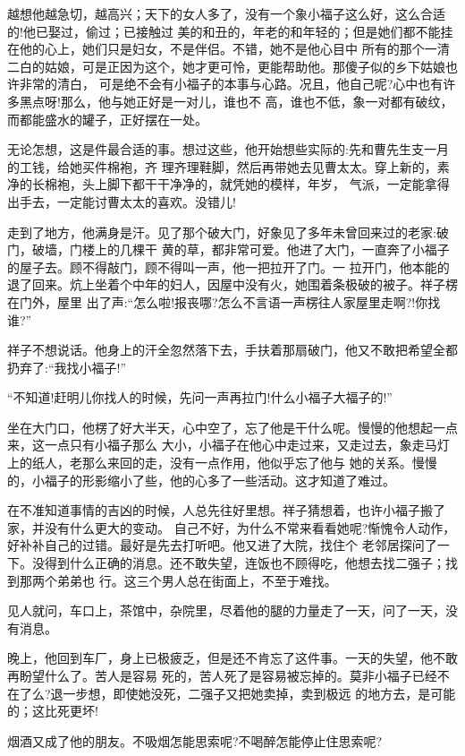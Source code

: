 \documentclass[11pt,a4paper,onecolumn]{article}
\begin{document}
越想他越急切，越高兴；天下的女人多了，没有一个象小福子这么好，这么合适的!他已娶过，偷过；已接触过
美的和丑的，年老的和年轻的；但是她们都不能挂在他的心上，她们只是妇女，不是伴侣。不错，她不是他心目中
所有的那个一清二白的姑娘，可是正因为这个，她才更可怜，更能帮助他。那傻子似的乡下姑娘也许非常的清白，
可是绝不会有小福子的本事与心路。况且，他自己呢?心中也有许多黑点呀!那么，他与她正好是一对儿，谁也不
高，谁也不低，象一对都有破纹，而都能盛水的罐子，正好摆在一处。

无论怎想，这是件最合适的事。想过这些，他开始想些实际的:先和曹先生支一月的工钱，给她买件棉袍，齐
理齐理鞋脚，然后再带她去见曹太太。穿上新的，素净的长棉袍，头上脚下都干干净净的，就凭她的模样，年岁，
气派，一定能拿得出手去，一定能讨曹太太的喜欢。没错儿!

走到了地方，他满身是汗。见了那个破大门，好象见了多年未曾回来过的老家:破门，破墙，门楼上的几棵干
黄的草，都非常可爱。他进了大门，一直奔了小福子的屋子去。顾不得敲门，顾不得叫一声，他一把拉开了门。一
拉开门，他本能的退了回来。炕上坐着个中年的妇人，因屋中没有火，她围着条极破的被子。祥子楞在门外，屋里
出了声:``怎么啦!报丧哪?怎么不言语一声楞往人家屋里走啊?!你找谁?''

祥子不想说话。他身上的汗全忽然落下去，手扶着那扇破门，他又不敢把希望全都扔弃了:``我找小福子!''

``不知道!赶明儿你找人的时候，先问一声再拉门!什么小福子大福子的!''

坐在大门口，他楞了好大半天，心中空了，忘了他是干什么呢。慢慢的他想起一点来，这一点只有小福子那么
大小，小福子在他心中走过来，又走过去，象走马灯上的纸人，老那么来回的走，没有一点作用，他似乎忘了他与
她的关系。慢慢的，小福子的形影缩小了些，他的心多了一些活动。这才知道了难过。

在不准知道事情的吉凶的时候，人总先往好里想。祥子猜想着，也许小福子搬了家，并没有什么更大的变动。
自己不好，为什么不常来看看她呢?惭愧令人动作，好补补自己的过错。最好是先去打听吧。他又进了大院，找住个
老邻居探问了一下。没得到什么正确的消息。还不敢失望，连饭也不顾得吃，他想去找二强子；找到那两个弟弟也
行。这三个男人总在街面上，不至于难找。

见人就问，车口上，茶馆中，杂院里，尽着他的腿的力量走了一天，问了一天，没有消息。

晚上，他回到车厂，身上已极疲乏，但是还不肯忘了这件事。一天的失望，他不敢再盼望什么了。苦人是容易
死的，苦人死了是容易被忘掉的。莫非小福子已经不在了么?退一步想，即使她没死，二强子又把她卖掉，卖到极远
的地方去，是可能的；这比死更坏!

烟酒又成了他的朋友。不吸烟怎能思索呢?不喝醉怎能停止住思索呢?
\end{document}
